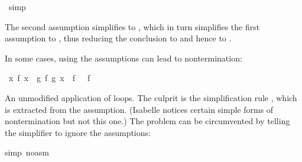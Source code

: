 \begin{isabellebody}
%
\isadelimproof
%
\endisadelimproof
%
\isatagproof
{}\isamarkupfalse%
\ simp\isanewline
{}\isamarkupfalse%
%
\endisatagproof
{\isafoldproof}%
%
\isadelimproof
%
\endisadelimproof
%
\begin{isamarkuptext}%
\noindent
The second assumption simplifies to , which in turn
simplifies the first assumption to , thus reducing the
conclusion to  and hence to .

In some cases, using the assumptions can lead to nontermination:%
\end{isamarkuptext}%
\isamarkuptrue%
\isamarkupfalse%
\ {}{}x{}\ f\ x\ {}\ g\ {}f\ {}g\ x{}{}\ {}\ f\ {}{}\ {}\ f\ {}{}\ {}\ {}{}{}%
\isadelimproof
%
\endisadelimproof
%
\isatagproof
%
\begin{isamarkuptxt}%
\noindent
An unmodified application of  loops.  The culprit is the
simplification rule , which is extracted from
the assumption.  (Isabelle notices certain simple forms of
nontermination but not this one.)  The problem can be circumvented by
telling the simplifier to ignore the assumptions:%
\end{isamarkuptxt}%
\isamarkuptrue%
\isamarkupfalse%
{}simp\ {}no{}asm{}{}\isanewline
{}\isamarkupfalse%
%
\endisatagproof
{\isafoldproof}%

\end{isabellebody}
